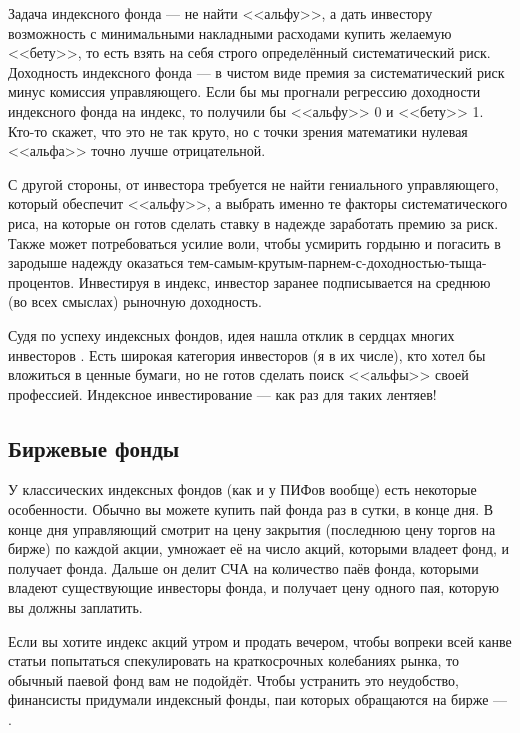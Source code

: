 Задача индексного фонда --- не найти <<альфу>>, а дать инвестору возможность с минимальными накладными расходами купить желаемую <<бету>>, то есть взять на себя строго определённый систематический риск. Доходность индексного фонда --- в чистом виде премия за систематический риск минус комиссия управляющего. Если бы мы прогнали регрессию доходности индексного фонда на индекс, то получили бы <<альфу>> 0 и <<бету>> 1. Кто-то скажет, что это не так круто, но с точки зрения математики нулевая <<альфа>> точно лучше отрицательной.

С другой стороны, от инвестора требуется не найти гениального управляющего, который обеспечит <<альфу>>, а выбрать именно те факторы систематического риса, на которые он готов сделать ставку в надежде заработать премию за риск. Также может потребоваться усилие воли, чтобы усмирить гордыню и погасить в зародыше надежду оказаться тем-самым-крутым-парнем-с-доходностью-тыща-процентов. Инвестируя в индекс, инвестор заранее подписывается на среднюю (во всех смыслах) рыночную доходность.

Судя по успеху индексных фондов, идея нашла отклик в сердцах многих инвесторов \cite{bogle2016index}. Есть широкая категория инвесторов (я в их числе), кто хотел бы вложиться в ценные бумаги, но не готов сделать поиск <<альфы>> своей профессией. Индексное инвестирование --- как раз для таких лентяев!

\subsection{Биржевые фонды}

У классических индексных фондов (как и у ПИФов вообще) есть некоторые особенности. Обычно вы можете купить пай фонда раз в сутки, в конце дня. В конце дня управляющий смотрит на цену закрытия (последнюю цену торгов на бирже) по каждой акции, умножает её на число акций, которыми владеет фонд, и получает  фонда. Дальше он делит СЧА на количество паёв фонда, которыми владеют существующие инвесторы фонда, и получает цену одного пая, которую вы должны заплатить.

Если вы хотите индекс акций утром и продать вечером, чтобы вопреки всей канве статьи попытаться спекулировать на краткосрочных колебаниях рынка, то обычный паевой фонд вам не подойдёт. Чтобы устранить это неудобство, финансисты придумали индексный фонды, паи которых обращаются на бирже --- .

